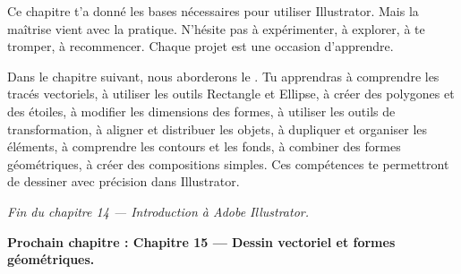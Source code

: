 Ce chapitre t'a donné les bases nécessaires pour utiliser Illustrator. Mais la maîtrise vient avec la pratique. N'hésite pas à expérimenter, à explorer, à te tromper, à recommencer. Chaque projet est une occasion d'apprendre.

Dans le chapitre suivant, nous aborderons le . Tu apprendras à comprendre les tracés vectoriels, à utiliser les outils Rectangle et Ellipse, à créer des polygones et des étoiles, à modifier les dimensions des formes, à utiliser les outils de transformation, à aligner et distribuer les objets, à dupliquer et organiser les éléments, à comprendre les contours et les fonds, à combiner des formes géométriques, à créer des compositions simples. Ces compétences te permettront de dessiner avec précision dans Illustrator.

\vspace{2em}

\begin{center}
\textit{Fin du chapitre 14 --- Introduction à Adobe Illustrator.}

\vspace{1em}

\textbf{Prochain chapitre : Chapitre 15 --- Dessin vectoriel et formes géométriques.}
\end{center}